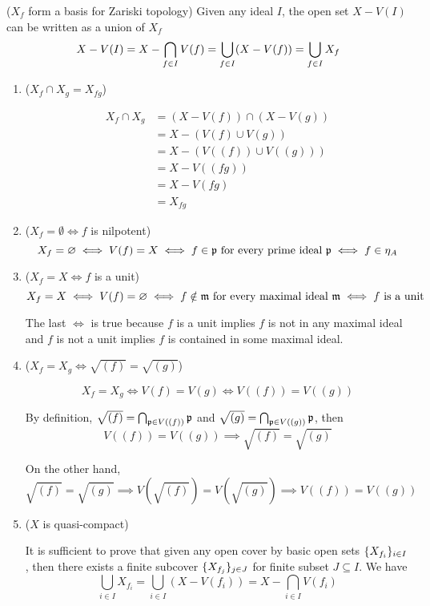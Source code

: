 \begin{longproof}
	($X_f$ form a basis for Zariski topology) Given any ideal $I$, the open set $X - V(I)$ can be written as a union of $X_f$ 
	$$
		X - V(I) = X - \bigcap_{f \in I} V(f) = \bigcup_{f \in I} \tuple*{X - V(f)} = \bigcup_{f \in I} X_f
	$$
	
	\begin{enumerate}
		\item ($X_f \cap X_g = X_{fg}$)
		
		\begin{align*}
			X_f \cap X_g
			&= (X - V(f)) \cap (X - V(g)) \\
			&= X - (V(f) \cup V(g)) \\
			&= X - (V((f)) \cup V((g))) \\
			&= X - V((fg)) \\
			&= X - V(fg) \\
			&= X_{fg}
		\end{align*}
		
		\item ($X_f = \emptyset \iff f$ is nilpotent)
		$$
			X_f = \varnothing \iff V(f) = X \iff f \in \mathfrak{p} \text{ for every prime ideal } \mathfrak{p} \iff f \in \eta_A
		$$
		
		\item ($X_f = X \iff f$ is a unit)
		$$
			X_f = X \iff V(f) = \varnothing \iff f \notin \mathfrak{m} \text{ for every maximal ideal } \mathfrak{m} \iff f \text{ is a unit}
		$$
		
		The last $\iff$ is true because $f$ is a unit implies $f$ is not in any maximal ideal and $f$ is not a unit  implies $f$ is contained in some maximal ideal.
		
		\item ($X_f = X_g \iff \sqrt{(f)} = \sqrt{(g)}$)
		
		$$
			X_f = X_g \iff V(f) = V(g) \iff V((f)) = V((g))
		$$
		
		By definition, $\sqrt{(f)} = \bigcap_{\mathfrak{p} \in V((f))} \mathfrak{p}$ and $\sqrt{(g)} = \bigcap_{\mathfrak{p} \in V((g))} \mathfrak{p}$, then 
		$$
			V((f)) = V((g)) \implies \sqrt{(f)} = \sqrt{(g)}
		$$
		
		On the other hand,
		$$
			\sqrt{(f)} = \sqrt{(g)} \implies V(\sqrt{(f)}) = V(\sqrt{(g)}) \implies V((f)) = V((g))
		$$
		
		\item ($X$ is quasi-compact)
		
		It is sufficient to prove that given any open cover by basic open sets $\{X_{f_i}\}_{i \in I}$, then there exists a finite subcover $\{X_{f_j}\}_{j \in J}$ for finite subset $J \subseteq I$. We have 
		$$
			\bigcup_{i \in I} X_{f_i} = \bigcup_{i \in I} (X - V(f_i)) = X - \bigcap_{i \in I} V(f_i)
		$$
		

\end{enumerate}
\end{longproof}
